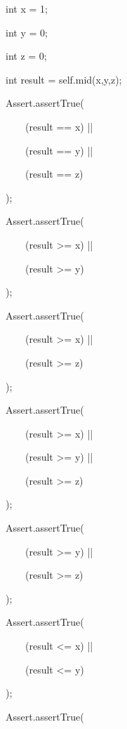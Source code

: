 \documentclass{article}
\newenvironment{tmindent}{\begin{tmparmod}{1.5em}{0pt}{0pt} }{\end{tmparmod}}
\newenvironment{tmparmod}[3]{\begin{list}{}{\setlength{\topsep}{0pt}\setlength{\leftmargin}{#1}\setlength{\rightmargin}{#2}\setlength{\parindent}{#3}\setlength{\listparindent}{\parindent}\setlength{\itemindent}{\parindent}\setlength{\parsep}{\parskip}} \item[]}{\end{list}}
\newenvironment{tmparsep}[1]{\begingroup\setlength{\parskip}{#1}}{\endgroup}
\begin{document}
\begin{example}
\begin{tmindent}
\begin{tmparsep}{0em}
      \ \ \ \ \ \ \ int x = 1;
      
      \ \ \ \ \ \ \ int y = 0;
      
      \ \ \ \ \ \ \ int z = 0;
      
      \ \ \ \ \ \ \ int result = self.mid(x,y,z);
      
      \ \ \ \ \ \ \ Assert.assertTrue(
      
      \ \ \ \ \ \ \ \ \ \ \ (result == x) ||
      
      \ \ \ \ \ \ \ \ \ \ \ (result == y) ||
      
      \ \ \ \ \ \ \ \ \ \ \ (result == z)
      
      \ \ \ \ \ \ \ );
      
      \ \ \ \ \ \ \ Assert.assertTrue(
      
      \ \ \ \ \ \ \ \ \ \ \ (result >= x) ||
      
      \ \ \ \ \ \ \ \ \ \ \ (result >= y)
      
      \ \ \ \ \ \ \ );
      
      \ \ \ \ \ \ \ Assert.assertTrue(
      
      \ \ \ \ \ \ \ \ \ \ \ (result >= x) ||
      
      \ \ \ \ \ \ \ \ \ \ \ (result >= z)
      
      \ \ \ \ \ \ \ );
      
      \ \ \ \ \ \ \ Assert.assertTrue(
      
      \ \ \ \ \ \ \ \ \ \ \ (result >= x) ||
      
      \ \ \ \ \ \ \ \ \ \ \ (result >= y) ||
      
      \ \ \ \ \ \ \ \ \ \ \ (result >= z)
      
      \ \ \ \ \ \ \ );
      
      \ \ \ \ \ \ \ Assert.assertTrue(
      
      \ \ \ \ \ \ \ \ \ \ \ (result >= y) ||
      
      \ \ \ \ \ \ \ \ \ \ \ (result >= z)
      
      \ \ \ \ \ \ \ );
      
      \ \ \ \ \ \ \ Assert.assertTrue(
      
      \ \ \ \ \ \ \ \ \ \ \ (result <= x) ||
      
      \ \ \ \ \ \ \ \ \ \ \ (result <= y)
      
      \ \ \ \ \ \ \ );
      
      \ \ \ \ \ \ \ Assert.assertTrue(
      

\end{tmparsep}
\end{tmindent}
\end{example}
\end{document}
